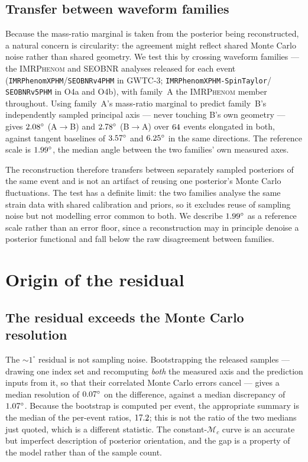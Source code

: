 \documentclass[aps,preprint,amsmath,amssymb,nofootinbib,superscriptaddress]{revtex4-2}
\begin{document}
\subsection{Transfer between waveform families}
\label{sec:xfam}
Because the mass-ratio marginal is taken from the posterior being reconstructed, a natural concern is
circularity: the agreement might reflect shared Monte Carlo noise rather than shared geometry. We test this
by crossing waveform families --- the \textsc{IMRPhenom} and \textsc{SEOBNR} analyses released for each
event (\texttt{IMRPhenomXPHM}/\texttt{SEOBNRv4PHM} in GWTC-3; \texttt{IMRPhenomXPHM-SpinTaylor}/%
\texttt{SEOBNRv5PHM} in O4a and O4b), with family~A the \textsc{IMRPhenom} member throughout. Using
family~A's mass-ratio marginal to predict family~B's independently
sampled principal axis --- never touching B's own geometry --- gives $2.08^\circ$ (A$\to$B) and
$2.78^\circ$ (B$\to$A) over $64$ events elongated in both, against tangent baselines of
$3.57^\circ$ and $6.25^\circ$ in the same directions. The reference scale is
$1.99^\circ$, the median angle between the two families' own measured axes.

The reconstruction therefore transfers between separately sampled posteriors of the same event and is not
an artifact of reusing one posterior's Monte Carlo fluctuations. The test has a definite limit: the two
families analyse the same strain data with shared calibration and priors, so it excludes reuse of sampling
noise but not modelling error common to both. We describe $1.99^\circ$ as a reference scale rather
than an error floor, since a reconstruction may in principle denoise a posterior functional and fall below
the raw disagreement between families.

\section{Origin of the residual}
\label{sec:residual}

\subsection{The residual exceeds the Monte Carlo resolution}
\label{sec:mcres}
The $\sim\!1^\circ$ residual is not sampling noise. Bootstrapping the released samples --- drawing one
index set and recomputing \emph{both} the measured axis and the prediction inputs from it, so that their
correlated Monte Carlo errors cancel --- gives a median resolution of $0.07^\circ$ on the
difference, against a median discrepancy of $1.07^\circ$. Because the bootstrap is computed per
event, the appropriate summary is the median of the per-event ratios, $17.2$; this is not the
ratio of the two medians just quoted, which is a different statistic. The
constant-$\mathcal{M}_c$ curve is an accurate but imperfect description of posterior orientation, and the
gap is a property of the model rather than of the sample count.
\end{document}
